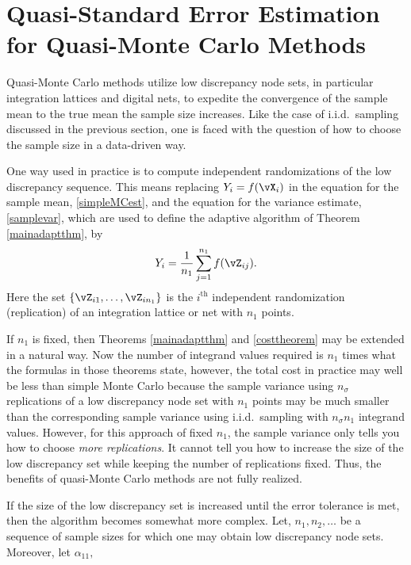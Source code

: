 \documentclass[graybox]{svmult}
\begin{document}



\section{Quasi-Standard Error Estimation for Quasi-Monte Carlo Methods} \label{qmcrepsec}

Quasi-Monte Carlo methods utilize low discrepancy node sets, in particular integration lattices and digital nets, to expedite the convergence of the sample mean to the true mean the sample size increases.  Like the case of i.i.d.\ sampling discussed in the previous section, one is faced with the question of how to choose the sample size in a data-driven way.

One way used in practice is to compute independent randomizations of the low discrepancy sequence.  This means replacing $Y_i=f(\vX_i)$ in the equation for the sample mean, \eqref{simpleMCest}, and the equation for the variance estimate, \eqref{samplevar}, which are used to define the adaptive algorithm of Theorem \ref{mainadaptthm}, by
\[
Y_i = \frac{1}{n_1} \sum_{j=1}^{n_1} f(\vZ_{ij}).
\]
Here the set $\{\vZ_{i1},\ldots, \vZ_{in_1}\}$ is the $i^{\text{th}}$ independent randomization (replication) of an integration lattice or net with $n_1$ points.  

If $n_1$ is fixed, then Theorems \ref{mainadaptthm} and \ref{costtheorem} may be extended in a natural way.  Now the number of integrand values required is $n_1$ times what the formulas in those theorems state, however, the total cost in practice may well be less than simple Monte Carlo because the sample variance using $n_{\sigma}$ replications of a low discrepancy node set with $n_1$ points may be much smaller than the corresponding sample variance using i.i.d.\ sampling with $n_{\sigma}n_1$ integrand values.  However, for this approach of fixed $n_1$, the sample variance only tells you how to choose \emph{more replications}.  It cannot tell you how to increase the size of the low discrepancy set while keeping the number of replications fixed.  Thus, the benefits of quasi-Monte Carlo methods are not fully realized.  

If the size of the low discrepancy set is increased until the error tolerance is met, then the algorithm becomes somewhat more complex.  Let, $n_1, n_2, \dots$ be a sequence of sample sizes for which one may obtain low discrepancy node sets.  Moreover, let $\alpha_{11}, \ $
\end{document}
